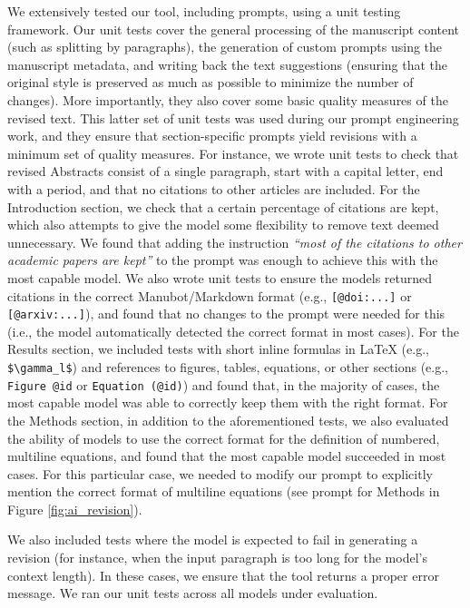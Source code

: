 \documentclass[
]{article}
\begin{document}
We extensively tested our tool, including prompts, using a unit testing framework.
Our unit tests cover the general processing of the manuscript content (such as splitting by paragraphs), the generation of custom prompts using the manuscript metadata, and writing back the text suggestions (ensuring that the original style is preserved as much as possible to minimize the number of changes).
More importantly, they also cover some basic quality measures of the revised text.
This latter set of unit tests was used during our prompt engineering work, and they ensure that section-specific prompts yield revisions with a minimum set of quality measures.
For instance, we wrote unit tests to check that revised Abstracts consist of a single paragraph, start with a capital letter, end with a period, and that no citations to other articles are included.
For the Introduction section, we check that a certain percentage of citations are kept, which also attempts to give the model some flexibility to remove text deemed unnecessary.
We found that adding the instruction \emph{``most of the citations to other academic papers are kept''} to the prompt was enough to achieve this with the most capable model.
We also wrote unit tests to ensure the models returned citations in the correct Manubot/Markdown format (e.g., \texttt{{[}@doi:...{]}} or \texttt{{[}@arxiv:...{]}}), and found that no changes to the prompt were needed for this (i.e., the model automatically detected the correct format in most cases).
For the Results section, we included tests with short inline formulas in LaTeX (e.g., \texttt{\$\textbackslash{}gamma\_l\$}) and references to figures, tables, equations, or other sections (e.g., \texttt{Figure\ @id} or \texttt{Equation\ (@id)}) and found that, in the majority of cases, the most capable model was able to correctly keep them with the right format.
For the Methods section, in addition to the aforementioned tests, we also evaluated the ability of models to use the correct format for the definition of numbered, multiline equations, and found that the most capable model succeeded in most cases.
For this particular case, we needed to modify our prompt to explicitly mention the correct format of multiline equations (see prompt for Methods in Figure \ref{fig:ai_revision}).

We also included tests where the model is expected to fail in generating a revision (for instance, when the input paragraph is too long for the model's context length).
In these cases, we ensure that the tool returns a proper error message.
We ran our unit tests across all models under evaluation.
\end{document}

